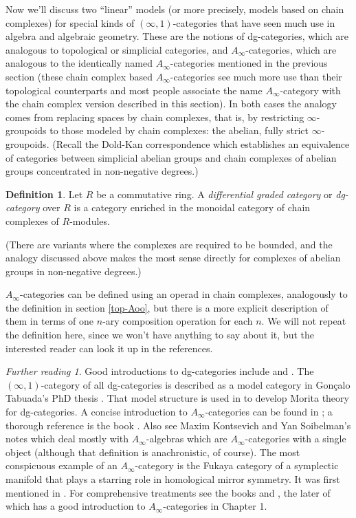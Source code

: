 \documentclass{conm-p-l}
\theoremstyle{definition} \newtheorem{definition}[theorem]{Definition}
\theoremstyle{remark} \newtheorem{remark}[theorem]{Remark}
\newtheorem*{further}{Further reading}
\numberwithin{equation}{section}
\newcommand{\oo}{\infty}
\newcommand{\io}{$(\oo,1)$}
\begin{document}
Now we'll discuss two ``linear'' models (or more precisely, models
based on chain complexes) for special kinds of \io-categories that
have seen much use in algebra and algebraic geometry. These are the
notions of dg-categories, which are analogous to topological or
simplicial categories, and $A_\oo$-categories, which are analogous to
the identically named $A_\oo$-categories mentioned in the previous
section (these chain complex based $A_\oo$-categories see much more
use than their topological counterparts and most people associate the
name $A_\oo$-category with the chain complex version described in this
section). In both cases the analogy comes from replacing spaces by
chain complexes, that is, by restricting $\oo$-groupoids to those
modeled by chain complexes: the abelian, fully strict $\oo$-groupoids.
(Recall the Dold-Kan correspondence which establishes an equivalence
of categories between simplicial abelian groups and chain complexes of
abelian groups concentrated in non-negative degrees.)

\begin{definition} Let $R$ be a commutative ring. A \emph{differential
graded category} or \emph{dg-category} over $R$ is a category enriched
in the monoidal category of chain complexes of $R$-modules.
\end{definition}

(There are variants where the complexes are required to be bounded,
and the analogy discussed above makes the most sense directly for
complexes of abelian groups in non-negative degrees.)

$A_\oo$-categories can be defined using an operad in chain complexes,
analogously to the definition in section \ref{top-Aoo}, but there is a
more explicit description of them in terms of one $n$-ary composition
operation for each $n$. We will not repeat the definition here, since
we won't have anything to say about it, but the interested reader can
look it up in the references.

\begin{further} Good introductions to dg-categories include
\cite{Keller} and \cite{ToenDG}. The \io-category of all dg-categories
is described as a model category in Gon\c{c}alo Tabuada's PhD thesis
\cite{Tabuada}. That model structure is used in \cite{ToenMorita}
to develop Morita theory for dg-categories.
A concise introduction to $A_\oo$-categories can be
found in \cite{Keller}; a thorough reference is the book
\cite{Bespalov}. Also see Maxim Kontsevich and Yan Soibelman's notes
\cite{KontsevichSoibelman} which deal mostly with $A_\oo$-algebras
which are $A_\oo$-categories with a single object (although that
definition is anachronistic, of course). The most conspicuous example
of an $A_\oo$-category is the Fukaya category of a symplectic manifold
that plays a starring role in homological mirror symmetry. It was
first mentioned in \cite{Fukaya}. For comprehensive treatments see the
books \cite{FOOO} and \cite{Seidel}, the later of which has a good
introduction to $A_\oo$-categories in Chapter 1. \end{further}
\end{document}
